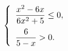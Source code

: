 \begin{ex}[type=ineq_system]
	\begin{condition}
		\( \left\{
		\begin{array}{l}
			\dfrac{x^2-6x}{6x^2+5}\le0,\vspace{2mm}\\
			\dfrac{6}{5-x}>0.
		\end{array}
		\right. \)
	\end{condition}
\end{ex}